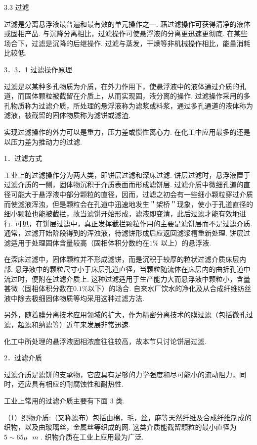 \documentclass[
]{article}
\author{}
\date{}
\begin{document}
3.3 过滤

过滤是分离悬浮液最普遍和最有效的单元操作之一. 藉过滤操作可获得清净的液体或固相产品. 与沉降分离相比，过滤操作可使悬浮液的分离更迅速更彻底. 在某些场合下，过滤是沉降的后继操作. 过滤与蒸发，干燥等非机械操作相比，能量消耗比较低. 

3．3．1 过滤操作原理

过滤是以某种多孔物质为介质，在外力作用下，使悬浮液中的液体通过介质的孔道，而固体颗粒被截留在介质上，从而实现固，液分离的操作. 过滤操作采用的多孔物质称为过滤介质，所处理的悬浮液称为滤浆或料浆，通过多孔通道的液体称为滤液，被截留的固体物质称为滤饼或滤渣.

实现过滤操作的外力可以是重力，压力差或惯性离心力. 在化工中应用最多的还是以压力差为推动力的过滤. 

1．过滤方式

工业上的过滤操作分为两大类，即饼层过滤和深床过滤. 饼层过滤时，悬浮液置于过滤介质的一侧，固体物沉积于介质表面而形成滤饼层. 过滤介质中微细孔道的直径可能大于悬浮液中部分颗粒的直径，因而，过滤之初会有一些细小颗粒穿过介质而使滤液浑浊，但是颗粒会在孔道中迅速地发生＂架桥＂现象，使小于孔道直径的细小颗粒也能被截拦，故当滤饼开始形成，滤液即变清，此后过滤才能有效地进行. 可见，在饼层过滤中，真正发挥截拦颗粒作用的主要是滤饼层而不是过滤介质. 通常，过滤开始阶段得到的浑浊液，待滤饼形成后应返回滤浆槽重新处理. 饼层过滤适用于处理固体含量较高（固相体积分数约在\(1\%\) 以上）的悬浮液. 

在深床过滤中，固体颗粒并不形成滤饼，而是沉积于较厚的粒状过滤介质床层内部. 悬浮液中的颗粒尺寸小于床层孔道直径，当颗粒随流体在床层内的曲折孔道中流过时，便附在过滤介质上. 这种过滤适用于生产能力大而悬浮液中颗粒小，含量甚微（固相体积分数在\(0.1\%\)以下）的场合. 自来水厂饮水的净化及从合成纤维纺丝液中除去极细固体物质等均采用这种过滤方法. 

另外，随着膜分离技术应用领域的扩大，作为精密分离技术的膜过滤（包括微孔过滤，超滤和纳滤等）近年来发展非常迅速. 

化工中所处理的悬浮液固相浓度往往较高，故本节只讨论饼层过滤. 

2．过滤介质

过滤介质是滤饼的支承物，它应具有足够的力学强度和尽可能小的流动阻力，同时，还应具有相应的耐腐蚀性和耐热性. 

工业上常用的过滤介质主要有下面 3 类. 

（1）织物介质:（又称滤布）包括由棉，毛，丝，麻等天然纤维及合成纤维制成的织物，以及由玻璃丝，金属丝等织成的网. 这类介质能截留颗粒的最小直径为\(5 \sim 65\mu\text{\ }m\) . 织物介质在工业上应用最为广泛. 
\end{document}
